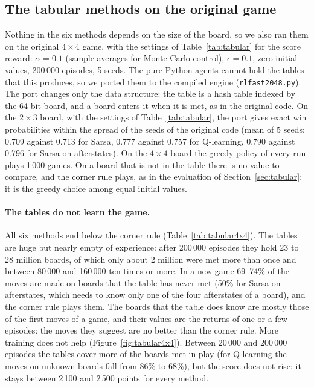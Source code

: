 \documentclass[11pt,a4paper]{article}
\theoremstyle{remark}
\begin{document}
\subsection{The tabular methods on the original game}
\label{sec:tabular4x4}

Nothing in the six methods depends on the size of the board, so we also ran them on the original $4\times4$ game, with the settings of Table~\ref{tab:tabular} for the score reward: $\alpha=0.1$ (sample averages for Monte Carlo control), $\epsilon=0.1$, zero initial values, 200\,000 episodes, 5 seeds. The pure-Python agents cannot hold the tables that this produces, so we ported them to the compiled engine (\texttt{rlfast2048.py}). The port changes only the data structure: the table is a hash table indexed by the 64-bit board, and a board enters it when it is met, as in the original code. On the $2\times3$ board, with the settings of Table~\ref{tab:tabular}, the port gives exact win probabilities within the spread of the seeds of the original code (mean of 5 seeds: 0.709 against 0.713 for Sarsa, 0.777 against 0.757 for Q-learning, 0.790 against 0.796 for Sarsa on afterstates). On the $4\times4$ board the greedy policy of every run plays 1\,000 games. On a board that is not in the table there is no value to compare, and the corner rule plays, as in the evaluation of Section~\ref{sec:tabular}: it is the greedy choice among equal initial values.

\paragraph{The tables do not learn the game.} All six methods end below the corner rule (Table~\ref{tab:tabular4x4}). The tables are huge but nearly empty of experience: after 200\,000 episodes they hold 23 to 28 million boards, of which only about 2 million were met more than once and between 80\,000 and 160\,000 ten times or more. In a new game 69--74\% of the moves are made on boards that the table has never met (50\% for Sarsa on afterstates, which needs to know only one of the four afterstates of a board), and the corner rule plays them. The boards that the table does know are mostly those of the first moves of a game, and their values are the returns of one or a few episodes: the moves they suggest are no better than the corner rule. More training does not help (Figure~\ref{fig:tabular4x4}). Between 20\,000 and 200\,000 episodes the tables cover more of the boards met in play (for Q-learning the moves on unknown boards fall from 86\% to 68\%), but the score does not rise: it stays between 2\,100 and 2\,500 points for every method.
\end{document}
